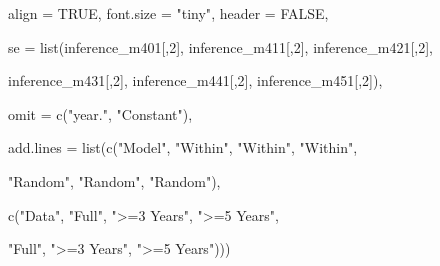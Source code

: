 \documentclass[a4paper,nobind]{templates/ociamthesis}
\newenvironment{Shaded}{\begin{snugshade}}{\end{snugshade}}
\newcommand{\AttributeTok}[1]{\textcolor[rgb]{0.77,0.63,0.00}{#1}}
\newcommand{\ConstantTok}[1]{\textcolor[rgb]{0.00,0.00,0.00}{#1}}
\newcommand{\DecValTok}[1]{\textcolor[rgb]{0.00,0.00,0.81}{#1}}
\newcommand{\FunctionTok}[1]{\textcolor[rgb]{0.00,0.00,0.00}{#1}}
\newcommand{\NormalTok}[1]{#1}
\newcommand{\StringTok}[1]{\textcolor[rgb]{0.31,0.60,0.02}{#1}}
\renewenvironment{Shaded}
{
  \vspace{10pt}%
  \begin{snugshade}%
}{%
  \end{snugshade}%
  \vspace{8pt}%
}
\begin{document}
\begin{landscape}
\begin{Shaded}
\begin{Highlighting}[]
          \AttributeTok{align =} \ConstantTok{TRUE}\NormalTok{, }\AttributeTok{font.size =} \StringTok{"tiny"}\NormalTok{, }\AttributeTok{header =} \ConstantTok{FALSE}\NormalTok{, }
         
         \AttributeTok{se =} \FunctionTok{list}\NormalTok{(inference\_m401[,}\DecValTok{2}\NormalTok{], inference\_m411[,}\DecValTok{2}\NormalTok{], inference\_m421[,}\DecValTok{2}\NormalTok{], }
          
\NormalTok{          inference\_m431[,}\DecValTok{2}\NormalTok{], inference\_m441[,}\DecValTok{2}\NormalTok{], inference\_m451[,}\DecValTok{2}\NormalTok{]),}
         
          \AttributeTok{omit =} \FunctionTok{c}\NormalTok{(}\StringTok{"year."}\NormalTok{, }\StringTok{"Constant"}\NormalTok{),}
          
          \AttributeTok{add.lines =} \FunctionTok{list}\NormalTok{(}\FunctionTok{c}\NormalTok{(}\StringTok{"Model"}\NormalTok{, }\StringTok{"Within"}\NormalTok{, }\StringTok{"Within"}\NormalTok{, }\StringTok{"Within"}\NormalTok{, }
                        
            \StringTok{"Random"}\NormalTok{, }\StringTok{"Random"}\NormalTok{, }\StringTok{"Random"}\NormalTok{), }
            
            \FunctionTok{c}\NormalTok{(}\StringTok{"Data"}\NormalTok{, }\StringTok{"Full"}\NormalTok{, }\StringTok{"\textgreater{}=3 Years"}\NormalTok{, }\StringTok{"\textgreater{}=5 Years"}\NormalTok{, }
                                             
            \StringTok{"Full"}\NormalTok{, }\StringTok{"\textgreater{}=3 Years"}\NormalTok{, }\StringTok{"\textgreater{}=5 Years"}\NormalTok{)))}
\end{Highlighting}
\end{Shaded}


\end{landscape}
\end{document}
